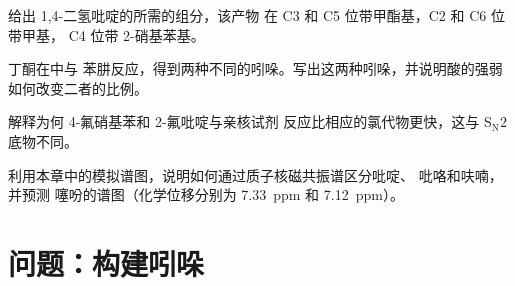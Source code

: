 \begin{exercise}[$\star\star$]\label{exo:b3:heterocycles:9}
给出 1,4-二氢吡啶的所需的组分，该产物
在 C3 和 C5 位带甲酯基，C2 和 C6 位带甲基，
C4 位带 2-硝基苯基。
\end{exercise}

\begin{exercise}[$\star\star\star$]\label{exo:b3:heterocycles:10}
丁酮在中与
苯肼反应，得到两种不同的吲哚。写出这两种吲哚，并说明酸的强弱如何改变二者的比例。
\end{exercise}

\begin{exercise}[$\star\star\star$]\label{exo:b3:heterocycles:11}
解释为何 4-氟硝基苯和 2-氟吡啶与亲核试剂
反应比相应的氯代物更快，这与 $\mathrm S_\mathrm N2$ 底物不同。
\end{exercise}

\begin{exercise}[$\star\star\star$]\label{exo:b3:heterocycles:12}
利用本章中的模拟谱图，说明如何通过质子核磁共振谱区分吡啶、
吡咯和呋喃，并预测
噻吩的谱图（化学位移分别为 \qty{7.33}{ppm} 和 \qty{7.12}{ppm}）。
\end{exercise}

\section{问题：构建吲哚}


